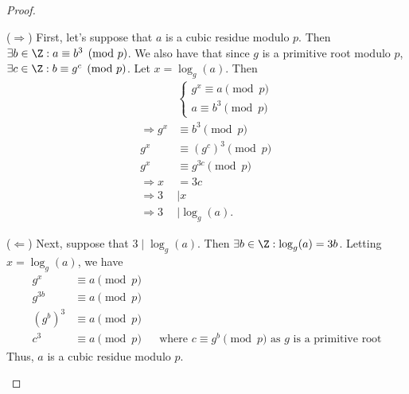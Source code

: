 \documentclass[
  coursecode={MTHE 418},
  assignmentname={Homework \homeworknumber},
  studentnumber=20053722,
  name={Bryan Hoang},z
  draft,
]{
  ltxanswer%
}
\begin{document}
\begin{questions}
\begin{parts}
      \part{}
      \begin{solution}
        \begin{proof}
          \begin{proofpart}
            (\(\Rightarrow\)) First, let's suppose that \(a\) is a cubic residue modulo \(p\). Then \(\exists b \in \Z : a \equiv b^{3} \pmod{p}\). We also have that since \(g\) is a primitive root modulo \(p\), \(\exists c \in \Z : b \equiv g^{c} \pmod{p}\). Let \(x = \log_{g}(a)\). Then
            \begin{align*}
                                &\begin{cases}
                                   g^{x} \equiv a \pmod{p} \\
                                   a \equiv b^{3} \pmod{p}
                                 \end{cases}     \\
              \Rightarrow g^{x} &\equiv b^{3} \pmod{p}       \\
              g^{x}             &\equiv (g^{c})^{3} \pmod{p} \\
              g^{x}             &\equiv g^{3c} \pmod{p}      \\
              \Rightarrow x     &= 3c                        \\
              \Rightarrow 3     &\mid x                      \\
              \Rightarrow 3     &\mid \log_{g}(a).
            \end{align*}
          \end{proofpart}

          \begin{proofpart}
            (\(\Leftarrow\)) Next, suppose that \(3 \mid \log_{g}(a)\). Then \(\exists b \in \Z : \log_{g}(a) = 3b\). Letting \(x = \log_{g}(a)\), we have
            \begin{align*}
              g^{x}       &\equiv a \pmod{p}                                                                          \\
              g^{3b}      &\equiv a \pmod{p}                                                                          \\
              (g^{b})^{3} &\equiv a \pmod{p}                                                                          \\
              c^{3}       &\equiv a \pmod{p} & &\text{where \(c \equiv g^{b} \pmod{p}\) as \(g\) is a primitive root}
            \end{align*}
            Thus, \(a\) is a cubic residue modulo \(p\).
          \end{proofpart}
        \end{proof}
      \end{solution}


\end{parts}
\end{questions}
\end{document}
